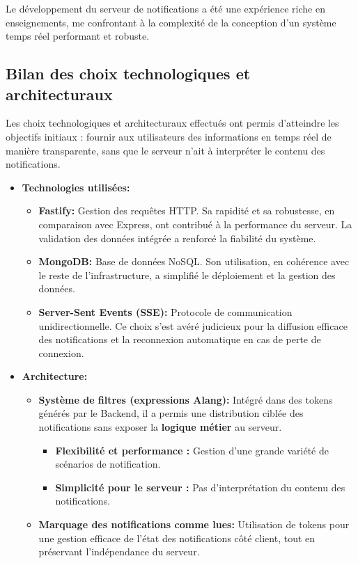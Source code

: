 
Le développement du serveur de notifications a été une expérience riche en
enseignements, me confrontant à la complexité de la conception d'un système
temps réel performant et robuste.

\subsection{Bilan des choix technologiques et architecturaux}

Les choix technologiques et architecturaux effectués ont permis d'atteindre les
objectifs initiaux : fournir aux utilisateurs des informations en temps réel
de manière transparente, sans que le serveur n'ait à interpréter le contenu
des notifications.

\begin{itemize}
\item {\bf Technologies utilisées: }
	\begin{itemize}
	    \item {\bf Fastify: } Gestion des requêtes HTTP. Sa rapidité et sa robustesse,
en comparaison avec Express, ont contribué à la performance du serveur. La
validation des données intégrée a renforcé la fiabilité du système.
	    \item {\bf MongoDB: } Base de données NoSQL. Son utilisation, en cohérence avec le
reste de l'infrastructure, a simplifié le déploiement et la gestion des données.
	    \item {\bf Server-Sent Events (SSE): } Protocole de communication unidirectionnelle. Ce
choix s'est avéré judicieux pour la diffusion efficace des notifications et la
reconnexion automatique en cas de perte de connexion.
	\end{itemize}
\item {\bf Architecture: }
	\begin{itemize}
    \item {\bf Système de filtres (expressions Alang): } Intégré dans des tokens
générés par le Backend, il a permis une distribution ciblée des notifications
sans exposer la {\bf logique métier} au serveur.
		\begin{itemize}
        \item {\bf Flexibilité et performance : } Gestion d'une grande variété de
scénarios de notification.
        \item {\bf Simplicité pour le serveur : } Pas d'interprétation du contenu
des notifications.
		\end{itemize}
    \item {\bf Marquage des notifications comme lues: } Utilisation de tokens
pour une gestion efficace de l'état des notifications côté client, tout en
préservant l'indépendance du serveur.
	\end{itemize}
\end{itemize}

